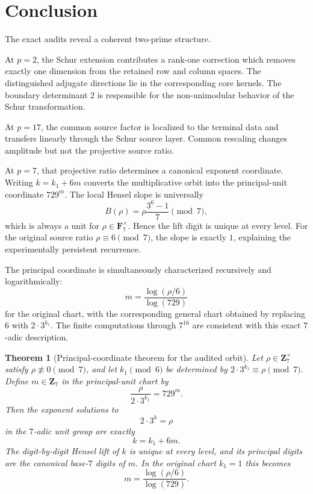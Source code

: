 \documentclass[11pt]{article}
\newtheorem{theorem}{Theorem}[section]
\theoremstyle{definition}
\theoremstyle{remark}
\begin{document}
\section{Conclusion}
The exact audits reveal a coherent two-prime structure.

At $p=2$, the Schur extension contributes a rank-one correction which removes exactly one dimension from the retained row and column spaces. The distinguished adjugate directions lie in the corresponding core kernels. The boundary determinant $2$ is responsible for the non-unimodular behavior of the Schur transformation.

At $p=17$, the common source factor is localized to the terminal data and transfers linearly through the Schur source layer. Common rescaling changes amplitude but not the projective source ratio.

At $p=7$, that projective ratio determines a canonical exponent coordinate. Writing $k=k_1+6m$ converts the multiplicative orbit into the principal-unit coordinate $729^m$. The local Hensel slope is universally
\[
B(\rho)=\rho\frac{3^6-1}{7}\pmod7,
\]
which is always a unit for $\rho\in\mathbf F_7^\times$. Hence the lift digit is unique at every level. For the original source ratio $\rho\equiv6\pmod7$, the slope is exactly $1$, explaining the experimentally persistent recurrence.

The principal coordinate is simultaneously characterized recursively and logarithmically:
\[
\boxed{
 m
 =
 \frac{\log(\rho/6)}{\log(729)}
}
\]
for the original chart, with the corresponding general chart obtained by replacing $6$ with $2\cdot3^{k_1}$. The finite computations through $7^{16}$ are consistent with this exact $7$-adic description.

\begin{theorem}[Principal-coordinate theorem for the audited orbit]
Let $\rho\in\mathbf Z_7^\times$ satisfy $\rho\not\equiv0\pmod7$, and let $k_1\pmod6$ be determined by $2\cdot3^{k_1}\equiv\rho\pmod7$. Define $m\in\mathbf Z_7$ in the principal-unit chart by
\[
\frac{\rho}{2\cdot3^{k_1}}=729^m.
\]
Then the exponent solutions to
\[
2\cdot3^k=\rho
\]
in the $7$-adic unit group are exactly
\[
 k=k_1+6m.
\]
The digit-by-digit Hensel lift of $k$ is unique at every level, and its principal digits are the canonical base-$7$ digits of $m$. In the original chart $k_1=1$ this becomes
\[
 m=\frac{\log(\rho/6)}{\log(729)}.
\]
\end{theorem}
\end{document}
